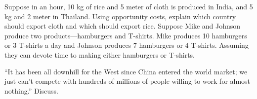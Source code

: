 \documentclass[11pt,letterpaper]{exam}
\begin{document}
\begin{questions}
\question  Suppose in an hour, 10 kg of rice and 5 meter of cloth is produced in India, and 5 kg and 2 meter in Thailand. Using opportunity costs, explain which country should export cloth and which should export rice.
\question Suppose Mike and Johnson produce two products—hamburgers and T-shirts. Mike
produces 10 hamburgers or 3 T-shirts a day and Johnson produces 7 hamburgers or
4 T-shirts. Assuming they can devote time to making either hamburgers or T-shirts.




\question “It has been all downhill for the West since China entered the world market; we just can’t compete with hundreds of millions of people willing to work for almost
nothing.” Discuss.


\end{questions}
\end{document}
